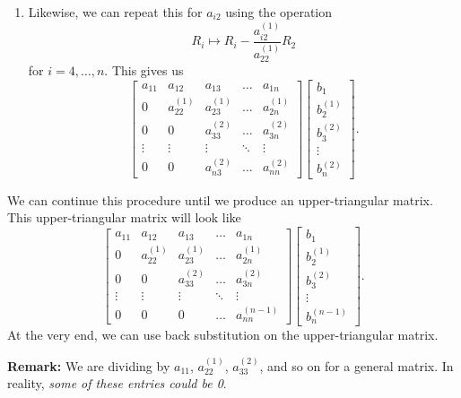 \documentclass[letterpaper]{article}
\newcommand{\0}{\mathbf{0}}
\begin{document}
\begin{enumerate}
    \item Likewise, we can repeat this for $a_{i2}$ using the operation 
    \[R_i \mapsto R_i - \frac{a_{i2}^{(1)}}{a_{22}^{(1)}} R_2\]
    for $i = 4, \hdots, n$. This gives us 
    \[\begin{bmatrix}
        a_{11} & a_{12} & a_{13} & \hdots & a_{1n} \\ 
        0      & a_{22}^{(1)} & a_{23}^{(1)} & \hdots & a_{2n}^{(1)} \\ 
        0      & 0       & a_{33}^{(2)} & \hdots & a_{3n}^{(2)} \\ 
        \vdots & \vdots & \vdots & \ddots & \vdots \\ 
        0      & 0       & a_{n3}^{(2)} & \hdots & a_{nn}^{(2)}
    \end{bmatrix} \begin{bmatrix}
        b_1 \\ b_2^{(1)} \\ b_3^{(2)} \\ \vdots \\ b_n^{(2)}
    \end{bmatrix}.\]
\end{enumerate}

We can continue this procedure until we produce an upper-triangular matrix. This upper-triangular matrix will look like 
\[\begin{bmatrix}
    a_{11} & a_{12} & a_{13} & \hdots & a_{1n} \\ 
    0      & a_{22}^{(1)} & a_{23}^{(1)} & \hdots & a_{2n}^{(1)} \\ 
    0      & 0       & a_{33}^{(2)} & \hdots & a_{3n}^{(2)} \\ 
    \vdots & \vdots & \vdots & \ddots & \vdots \\ 
    0      & 0       & 0            & \hdots & a_{nn}^{(n - 1)}
\end{bmatrix} \begin{bmatrix}
    b_1 \\ b_2^{(1)} \\ b_3^{(2)} \\ \vdots \\ b_n^{(n - 1)}
\end{bmatrix}.\]
At the very end, we can use back substitution on the upper-triangular matrix. 

\bigskip 

\textbf{Remark:} We are dividing by $a_{11}$, $a_{22}^{(1)}$, $a_{33}^{(2)}$, and so on for a general matrix. In reality, \emph{some of these entries could be 0}. 
\end{document}
